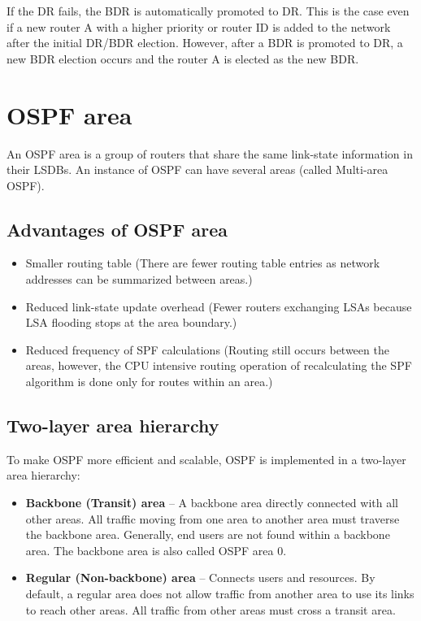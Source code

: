 If the DR fails, the BDR is automatically promoted to DR. This is the case even if a new router A with a higher priority or router ID is added to the network after the initial DR/BDR election. However, after a BDR is promoted to DR, a new BDR election occurs and the router A is elected as the new BDR.

\section{OSPF area}
An OSPF area is a group of routers that share the same link-state information in their LSDBs. An instance of OSPF can have several areas (called Multi-area OSPF).

\subsection{Advantages of OSPF area}

\begin{itemize}
\item Smaller routing table (There are fewer routing table entries as network addresses can be summarized between areas.)
\item Reduced link-state update overhead (Fewer routers exchanging LSAs because LSA flooding stops at the area boundary.)
\item Reduced frequency of SPF calculations (Routing still occurs between the areas, however, the CPU intensive routing operation of recalculating the SPF algorithm is done only for routes within an area.)
\end{itemize}

\subsection{Two-layer area hierarchy}

To make OSPF more efficient and scalable, OSPF is implemented in a two-layer area hierarchy:

\begin{itemize}
\item \textbf{Backbone (Transit) area} -- A backbone area directly connected with all other areas. All traffic moving from one area to another area must traverse the backbone area. Generally, end users are not found within a backbone area. The backbone area is also called OSPF area 0.
\item \textbf{Regular (Non-backbone) area} -- Connects users and resources. By default, a regular area does not allow traffic from another area to use its links to reach other areas. All traffic from other areas must cross a transit area.
\end{itemize}
	
